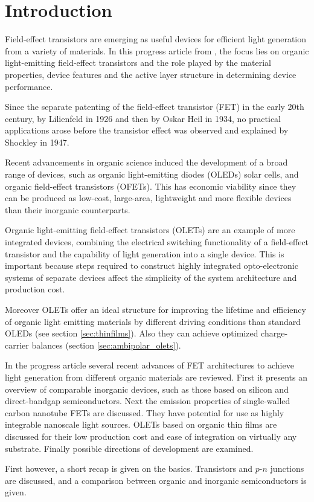 \section{Introduction}
Field-effect transistors are emerging as useful devices for efficient light generation from a variety of materials. In this progress article from \citet{Muccini}, the focus lies on organic light-emitting field-effect transistors and the role played by the material properties, device features and the active layer structure in determining device performance.

Since the separate patenting of the field-effect transistor (FET) in the early 20th century, by Lilienfeld in 1926 and then by Oskar Heil in 1934, no practical applications arose before the transistor effect was observed and explained by Shockley in 1947.

Recent advancements in organic science induced the development of a broad range of devices, such as organic light-emitting diodes (OLEDs) solar cells, and organic field-effect transistors (OFETs). This has economic viability since they can be produced as low-cost, large-area, lightweight and more flexible devices than their inorganic counterparts.

Organic light-emitting field-effect transistors (OLETs) are an example of more integrated devices, combining the electrical switching functionality of a field-effect transistor and the capability of light generation into a single device. This is important because steps required to construct highly integrated opto-electronic systems of separate devices affect the simplicity of the system architecture and production cost.

Moreover OLETs offer an ideal structure for improving the lifetime and efficiency of organic light emitting materials by different driving conditions than standard OLEDs (see section \ref{sec:thinfilms}). Also they can achieve optimized charge-carrier balances (section \ref{sec:ambipolar_olets}).

In the progress article several recent advances of FET architectures to achieve light generation from different organic materials are reviewed. First it presents an overview of comparable inorganic devices, such as those based on silicon and direct-bandgap semiconductors. Next the emission properties of single-walled carbon nanotube FETs are discussed. They have potential for use as highly integrable nanoscale light sources. OLETs based on organic thin films are discussed for their low production cost and ease of integration on virtually any substrate. Finally possible directions of development are examined.

First however, a short recap is given on the basics. Transistors and $p$-$n$ junctions are discussed, and a comparison between organic and inorganic semiconductors is given.